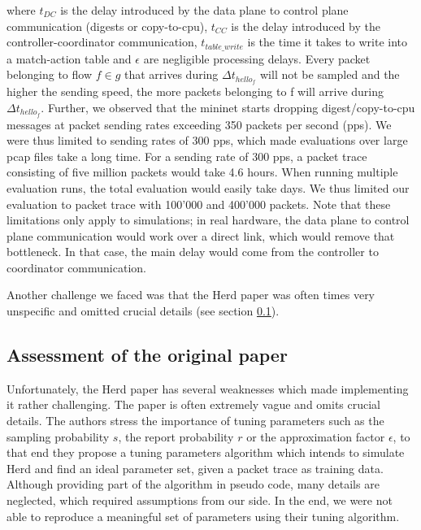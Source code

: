 \documentclass[11pt,oneside,a4paper]{article}
\begin{document}
\noindent where $t_{DC}$ is the delay introduced by the data plane to control plane communication (digests or copy-to-cpu), $t_{CC}$ is the delay introduced by the controller-coordinator communication, $t_{table\_write}$ is the time it takes to write into a match-action table and $\epsilon$ are negligible processing delays. Every packet belonging to flow $f \in g$ that arrives during $\Delta t_{hello_f}$ will not be sampled and the higher the sending speed, the more packets belonging to f will arrive during $\Delta t_{hello_f}$. Further, we observed that the mininet starts dropping digest/copy-to-cpu messages at packet sending rates exceeding 350 packets per second (pps). We were thus limited to sending rates of 300 pps, which made evaluations over large pcap files take a long time. For a sending rate of 300 pps, a packet trace consisting of five million packets would take 4.6 hours. When running multiple evaluation runs, the total evaluation would easily take days. We thus limited our evaluation to packet trace with 100'000 and 400'000 packets. Note that these limitations only apply to simulations; in real hardware, the data plane to control plane communication would work over a direct link, which would remove that bottleneck. In that case, the main delay would come from the controller to coordinator communication.

\noindent Another challenge we faced was that the Herd paper \cite{anon2019herd} was often times very unspecific and omitted crucial details (see section \ref{original_paper}).


\subsection{Assessment of the original paper} \label{original_paper}

Unfortunately, the Herd paper \cite{anon2019herd} has several weaknesses which made implementing it rather challenging. The paper is often extremely vague and omits crucial details. The authors stress the importance of tuning parameters such as the sampling probability $s$, the report probability $r$ or the approximation factor $\epsilon$, to that end they propose a tuning parameters algorithm which intends to simulate Herd and find an ideal parameter set, given a packet trace as training data. Although providing part of the algorithm in pseudo code, many details are neglected, which required assumptions from our side. In the end, we were not able to reproduce a meaningful set of parameters using their tuning algorithm.
\end{document}

